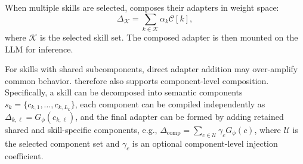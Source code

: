 When multiple skills are selected, \method{} composes their adapters in weight space:
\begin{equation}
    \Delta_{\mathcal{K}}
    =
    \sum_{k\in \mathcal{K}}
    \alpha_k \mathcal{C}[k],
\end{equation}
where $\mathcal{K}$ is the selected skill set. The composed adapter is then mounted on the LLM for inference.

For skills with shared subcomponents, direct adapter addition may over-amplify common behavior. \method{} therefore also supports component-level composition. Specifically, a skill can be decomposed into semantic components $s_k=\{c_{k,1},\ldots,c_{k,L_k}\}$, each component can be compiled independently as $\Delta_{k,\ell}=G_\phi(c_{k,\ell})$, and the final adapter can be formed by adding retained shared and skill-specific components, e.g., $\Delta_{\mathrm{comp}}=\sum_{c\in\mathcal{U}}\gamma_cG_\phi(c)$, where $\mathcal{U}$ is the selected component set and $\gamma_c$ is an optional component-level injection coefficient.
